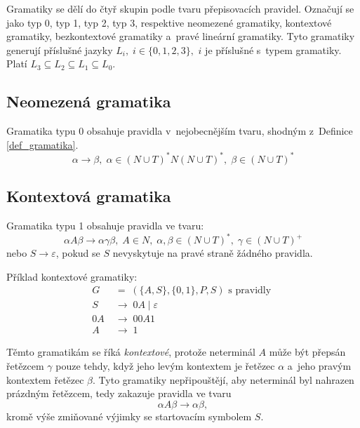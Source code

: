 Gramatiky se dělí do čtyř skupin podle tvaru přepisovacích pravidel.
Označují se jako typ 0, typ 1, typ 2, typ 3, respektive neomezené gramatiky, kontextové gramatiky, bezkontextové gramatiky a~pravé lineární gramatiky.
Tyto gramatiky generují příslušné jazyky $L_i,\; i \in \{0, 1, 2, 3\},$ $i$ je příslušné s~typem gramatiky.
Platí $L_3 \subseteq L_2 \subseteq L_1 \subseteq L_0$.

\subsection*{Neomezená gramatika}
Gramatika typu 0 obsahuje pravidla v~nejobecnějším tvaru, shodným z~Definice \ref{def_gramatika}.
\begin{equation*}
    \alpha \rightarrow \beta,\; \alpha \in (N \cup T)^*N(N \cup T)^*,\; \beta \in (N \cup T)^*
\end{equation*}

\subsection*{Kontextová gramatika}
Gramatika typu 1 obsahuje pravidla ve tvaru:
\begin{equation*}
    \alpha A \beta \rightarrow \alpha \gamma \beta,\; A \in N,\; \alpha, \beta \in (N \cup T)^*,\; \gamma \in (N \cup T)^+
\end{equation*}
nebo $S \rightarrow \varepsilon$, pokud se $S$ nevyskytuje na pravé straně žádného pravidla.
\begin{example}
    Příklad kontextové gramatiky:
    \begin{align*}
        G \; &= \; (\{A, S\}, \{0, 1\}, P, S) \text{ s~pravidly }\\
        S \; &\rightarrow \; 0A \; | \; \varepsilon \\ 
        0A \; &\rightarrow \; 00A1 \\
        A \; &\rightarrow \; 1
    \end{align*}
\end{example}

Těmto gramatikám se říká \emph{kontextové}, protože neterminál $A$ může být přepsán řetězcem $\gamma$ pouze tehdy, když jeho levým kontextem je řetězec $\alpha$ a~jeho pravým kontextem řetězec $\beta$.
Tyto gramatiky nepřipouštějí, aby neterminál byl nahrazen prázdným řetězcem, tedy zakazuje pravidla ve tvaru
\begin{equation*}
    \alpha A \beta \rightarrow \alpha \beta,
\end{equation*}
kromě výše zmiňované výjimky se startovacím symbolem $S$.

